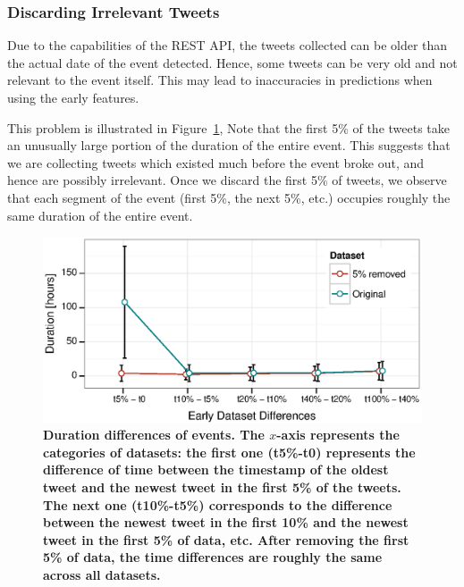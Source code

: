 \subsubsection{Discarding Irrelevant Tweets}
\label{subsubsec:discarding_irrelevant_tweets}

Due to the capabilities of the REST API, the tweets collected can be
older than the actual date of the event detected. Hence, 
some tweets can be very old and not relevant to the event itself. This
may lead to inaccuracies in predictions when using the early features.

This problem is illustrated in Figure~\ref{fig:duration-differences},
Note that the first 5\% of the tweets take an unusually
large portion of the duration of the entire event. This suggests that
we are collecting tweets which existed much before the event broke
out, and hence are possibly irrelevant. Once we discard the first 5\%
of tweets, we observe that each segment of the event (first 5\%, the
next 5\%, etc.) occupies roughly the same duration of the entire event.

\begin{figure}
  \centering
  \includegraphics[width=.7\textwidth]{figures_supp/Plots_from_data/time_differences.eps}
  \caption[Duration differences of events.]{\textbf{Duration
      differences of events. The $x$-axis represents the categories of
      datasets: the first one (t5\%-t0) represents the difference of
      time between the timestamp of the oldest tweet and the newest
      tweet in the first 5\% of the tweets. The next one (t10\%-t5\%)
      corresponds to the difference between the newest tweet in the
      first 10\% and the newest tweet in the first 5\% of data, etc.
      After removing the first 5\% of data, the time differences are
      roughly the same across all datasets.
    }}\label{fig:duration-differences}

\end{figure}

